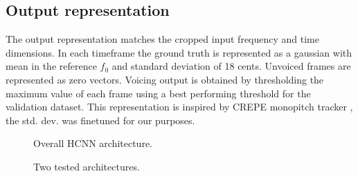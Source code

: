 \documentclass{article}
\begin{document}
\subsection{Output representation}

The output representation matches the cropped input frequency and time dimensions. In each timeframe the ground truth is represented as a gaussian with mean in the reference $f_0$ and standard deviation of 18 cents. Unvoiced frames are represented as zero vectors. Voicing output is obtained by thresholding the maximum value of each frame using a best performing threshold for the validation dataset. This representation is inspired by CREPE monopitch tracker \cite{Kim2018}, the std. dev. was finetuned for our purposes.


\begin{figure}
 \centerline{}
 \caption{Overall HCNN architecture.}
 \label{fig:hcnn_overall}
\end{figure}


\begin{figure}
 \centerline{}
 \caption{Two tested architectures.}
 \label{fig:hcnn_archs}
\end{figure}
\end{document}
